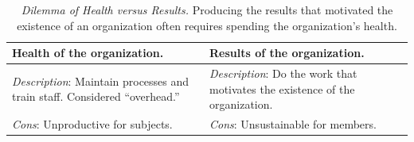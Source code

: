 

\begin{center}
\begin{table}[H] %
\begin{tabular}{ | m{\dilemmatablewidth}| m{\dilemmatablewidth} | } 
  \hline
  \textbf{Health of the organization.} & 
  \textbf{Results of the organization.} \\ 
  \hline
  \textit{Description}: Maintain processes and train staff. Considered ``overhead.'' & 
  \textit{Description}: Do the work that motivates the existence of the organization. \\  
    \hline
  \textit{Cons}: Unproductive for subjects. & 
  \textit{Cons}: Unsustainable for members. \\
  \hline
\end{tabular}
\caption{
\textit{Dilemma of Health versus Results.}
 Producing the results that motivated the existence of an organization often requires spending the organization's health.
}
\label{table:dilemma-personal-health-vs-results}
\end{table}
\end{center}


